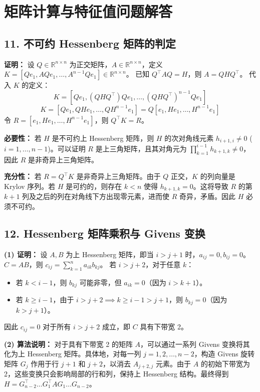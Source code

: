 \documentclass{article}
\begin{document}
\section*{矩阵计算与特征值问题解答}

\subsection*{11. 不可约 Hessenberg 矩阵的判定}
\textbf{证明：} 
设 \(Q \in \mathbb{R}^{n \times n}\) 为正交矩阵，\(A \in \mathbb{R}^{n \times n}\)，定义 \(K = [Qe_1, AQe_1, \dots, A^{n-1}Qe_1] \in \mathbb{R}^{n \times n}\)。
已知 \(Q^\top A Q = H\)，则 \(A = Q H Q^\top\)。
代入 \(K\) 的定义：
\[
 K = [Qe_1, (Q H Q^\top) Qe_1, \dots, (Q H Q^\top)^{n-1} Qe_1] 
\]
\[
 K = [Qe_1, Q H e_1, \dots, Q H^{n-1} e_1] = Q [e_1, H e_1, \dots, H^{n-1} e_1] 
\]
令 \(R = [e_1, H e_1, \dots, H^{n-1} e_1]\)，则 \(Q^\top K = R\)。

\textbf{必要性：} 若 \(H\) 是不可约上 Hessenberg 矩阵，则 \(H\) 的次对角线元素 \(h_{i+1,i} \neq 0\) (\(i=1,\dots,n-1\))。可以证明 \(R\) 是上三角矩阵，且其对角元为 \(\prod_{k=1}^{i-1} h_{k+1,k} \neq 0\)，因此 \(R\) 是非奇异上三角矩阵。

\textbf{充分性：} 若 \(R = Q^\top K\) 是非奇异上三角矩阵。由于 \(Q\) 正交，\(K\) 的列向量是 Krylov 序列。若 \(H\) 是可约的，则存在 \(k < n\) 使得 \(h_{k+1,k} = 0\)。这将导致 \(R\) 的第 \(k+1\) 列及之后的列在对角线下方出现零元素，进而使 \(R\) 奇异，矛盾。因此 \(H\) 必须不可约。

\subsection*{12. Hessenberg 矩阵乘积与 Givens 变换}
\textbf{(1) 证明：} 
设 \(A, B\) 为上 Hessenberg 矩阵，即当 \(i > j+1\) 时，\(a_{ij}=0, b_{ij}=0\)。
\(C = AB\)，则 \(c_{ij} = \sum_{k=1}^n a_{ik} b_{kj}\)。
若 \(i > j+2\)，对于任意 \(k\)：
\begin{itemize}
    \item 若 \(k < i-1\)，则 \(b_{kj}\) 可能非零，但 \(a_{ik}=0\)（因为 \(i > k+1\)）。
    \item 若 \(k \ge i-1\)，由于 \(i > j+2 \implies k \ge i-1 > j+1\)，则 \(b_{kj}=0\)（因为 \(k > j+1\)）。
\end{itemize}
因此 \(c_{ij} = 0\) 对于所有 \(i > j+2\) 成立，即 \(C\) 具有下带宽 2。

\textbf{(2) 算法说明：}
对于具有下带宽 2 的矩阵 \(A\)，可以通过一系列 Givens 变换将其化为上 Hessenberg 矩阵。具体地，对每一列 \(j = 1, 2, \dots, n-2\)，构造 Givens 旋转矩阵 \(G_j\) 作用于行 \(j+1\) 和 \(j+2\)，以消去 \(A_{j+2, j}\) 元素。由于 \(A\) 的初始下带宽为 2，这些变换只会影响局部的行和列，保持上 Hessenberg 结构。最终得到 \(H = G_{n-2}^\top \dots G_1^\top A G_1 \dots G_{n-2}\)。
\end{document}

